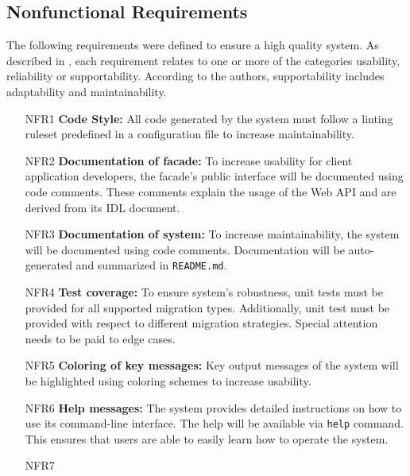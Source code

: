 \subsection{Nonfunctional Requirements}
\label{subsec:NonfunctionalRequirements}
The following requirements were defined to ensure a high quality system. As described in \cite{bruegge_object-oriented_2010}, each requirement relates to one or more of the categories usability, reliability or supportability. According to the authors, supportability includes adaptability and maintainability.

\begin{itemize}[itemindent=-13pt, leftmargin=43pt, align=left]
    \item [NFR1\hphantom{1}]  \textbf{Code Style:} All code generated by the system must follow a linting ruleset predefined in a configuration file to increase maintainability.
    \item [NFR2\hphantom{1}]  \textbf{Documentation of facade:} To increase usability for client application developers, the facade's public interface will be documented using code comments. These comments explain the usage of the Web API and are derived from its IDL document.
    \item [NFR3\hphantom{1}]  \textbf{Documentation of system:} To increase maintainability, the system will be documented using code comments. Documentation will be auto-generated and summarized in \texttt{README.md}.
    \item [NFR4\hphantom{1}]  \textbf{Test coverage:} To ensure system's robustness, unit tests must be provided for all supported migration types. Additionally, unit test must be provided with respect to different migration strategies. Special attention needs to be paid to edge cases.
    \item [NFR5\hphantom{1}] 
    \textbf{Coloring of key messages:} Key output messages of the system will be highlighted using coloring schemes to increase usability.
    \item [NFR6\hphantom{1}] 
    \textbf{Help messages:} The system provides detailed instructions on how to use its command-line interface. The help will be available via \texttt{help} command. This ensures that users are able to easily learn how to operate the system.
    \item [NFR7\hphantom{1}] 

\end{itemize}
